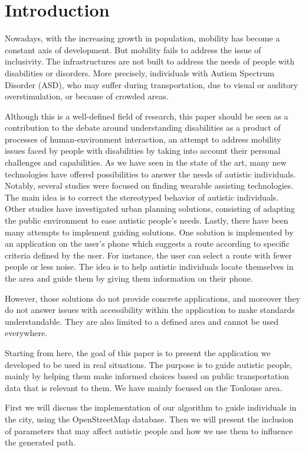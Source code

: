 \section{Introduction}


Nowadays, with the increasing growth in population, mobility has become a constant axis of development. But mobility fails to address the issue of inclusivity. The infrastructures are not built to address the needs of people with disabilities or disorders. More precisely, individuals with Autism Spectrum Disorder (ASD), who may suffer during transportation, due to visual or auditory overstimulation, or because of crowded areas.


Although this is a well-defined field of research, this paper should be seen as a contribution to the debate around understanding disabilities as a product of processes of human-environment interaction, an attempt to address mobility issues faced by people with disabilities by taking into account their personal challenges and capabilities.
As we have seen in the state of the art, many new technologies have offered possibilities to answer the needs of autistic individuals. Notably, several studies were focused on finding wearable assisting technologies. The main idea is to correct the stereotyped behavior of autistic individuals. Other studies have investigated urban planning solutions, consisting of adapting the public environment to ease autistic people's needs.
Lastly, there have been many attempts to implement guiding solutions. One solution is implemented by an application on the user’s phone which suggests a route according to specific criteria defined by the user. For instance, the user can select a route with fewer people or less noise. The idea is to help autistic individuals locate themselves in the area and guide them by giving them information on their phone.


However, those solutions do not provide concrete applications, and moreover they do not answer issues with accessibility within the application to make standards understandable. They are also limited to a defined area and cannot be used everywhere.


	Starting from here, the goal of this paper is to present the application we developed to be used in real situations. The purpose is to guide autistic people, mainly by helping them make informed choices based on public transportation data that is relevant to them. We have mainly focused on the Toulouse area. 


First we will discuss the implementation of our algorithm to guide individuals in the city, using the OpenStreetMap database. Then we will present the inclusion of parameters that may affect autistic people and how we use them to influence the generated path. 


